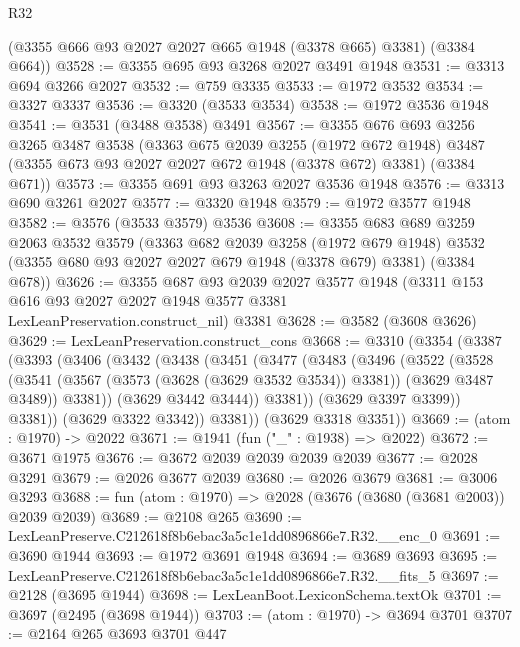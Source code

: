 \begin{lexlean}{R32}
\begin{coremodule}
      (@3355 @666 @93 @2027 @2027 @665 @1948 (@3378 @665) @3381)
      (@3384 @664))
@3528 := @3355 @695 @93 @3268 @2027 @3491 @1948
@3531 := @3313 @694 @3266 @2027
@3532 := @759 @3335
@3533 := @1972 @3532
@3534 := @3327 @3337
@3536 := @3320 (@3533 @3534)
@3538 := @1972 @3536 @1948
@3541 := @3531 (@3488 @3538) @3491
@3567 := @3355
    @676
    @693
    @3256
    @3265
    @3487
    @3538
    (@3363
      @675
      @2039
      @3255
      (@1972 @672 @1948)
      @3487
      (@3355 @673 @93 @2027 @2027 @672 @1948 (@3378 @672) @3381)
      (@3384 @671))
@3573 := @3355 @691 @93 @3263 @2027 @3536 @1948
@3576 := @3313 @690 @3261 @2027
@3577 := @3320 @1948
@3579 := @1972 @3577 @1948
@3582 := @3576 (@3533 @3579) @3536
@3608 := @3355
    @683
    @689
    @3259
    @2063
    @3532
    @3579
    (@3363
      @682
      @2039
      @3258
      (@1972 @679 @1948)
      @3532
      (@3355 @680 @93 @2027 @2027 @679 @1948 (@3378 @679) @3381)
      (@3384 @678))
@3626 := @3355
    @687
    @93
    @2039
    @2027
    @3577
    @1948
    (@3311 @153 @616 @93 @2027 @2027 @1948 @3577 @3381 LexLeanPreservation.construct_nil)
    @3381
@3628 := @3582 (@3608 @3626)
@3629 := LexLeanPreservation.construct_cons
@3668 := @3310
    (@3354
      (@3387
        (@3393
          (@3406
            (@3432
              (@3438
                (@3451
                  (@3477
                    (@3483
                      (@3496
                        (@3522
                          (@3528
                            (@3541
                              (@3567 (@3573 (@3628 (@3629 @3532 @3534)) @3381))
                              (@3629 @3487 @3489))
                            @3381))
                        (@3629 @3442 @3444))
                      @3381))
                  (@3629 @3397 @3399))
                @3381))
            (@3629 @3322 @3342))
          @3381))
      (@3629 @3318 @3351))
@3669 := (atom : @1970) -> @2022
@3671 := @1941 (fun ("_" : @1938) => @2022)
@3672 := @3671 @1975
@3676 := @3672 @2039 @2039 @2039 @2039
@3677 := @2028 @3291
@3679 := @2026 @3677 @2039
@3680 := @2026 @3679
@3681 := @3006 @3293
@3688 := fun (atom : @1970) => @2028 (@3676 (@3680 (@3681 @2003)) @2039 @2039)
@3689 := @2108 @265
@3690 := LexLeanPreserve.C212618f8b6ebac3a5c1e1dd0896866e7.R32.__enc_0
@3691 := @3690 @1944
@3693 := @1972 @3691 @1948
@3694 := @3689 @3693
@3695 := LexLeanPreserve.C212618f8b6ebac3a5c1e1dd0896866e7.R32.__fits_5
@3697 := @2128 (@3695 @1944)
@3698 := LexLeanBoot.LexiconSchema.textOk
@3701 := @3697 (@2495 (@3698 @1944))
@3703 := (atom : @1970) -> @3694 @3701
@3707 := @2164 @265 @3693 @3701 @447

\end{coremodule}
\end{lexlean}
